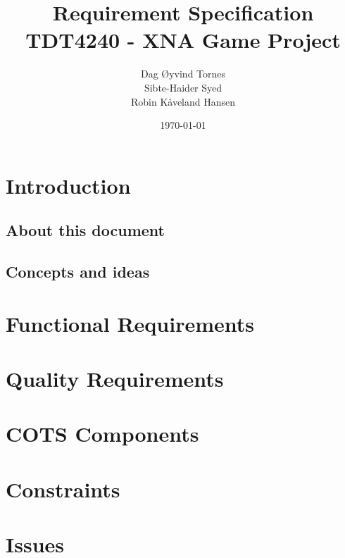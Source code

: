 \documentclass[titlepage,a4paper,11pt]{article}
\date{\today}
\begin{document}
\title{Requirement Specification\\
 		TDT4240 - XNA Game Project}

\author{Dag Øyvind Tornes\\
 		Sibte-Haider Syed\\ 
		Robin Kåveland Hansen\\}
\maketitle

\pagestyle{empty}
\tableofcontents
\clearpage
\pagestyle{plain}

\section{Introduction}
	\subsection{About this document}
		

\subsection{Concepts and ideas}
	\label{concepts}
	

\section{Functional Requirements}
	\label{funcreq}
	

\section{Quality Requirements}
	\label{qualreq}
	

\section{COTS Components}
	\label{components}
	

\section{Constraints}
	\label{constraints}
	

\section{Issues}
	\label{issues}
	
\end{document}
